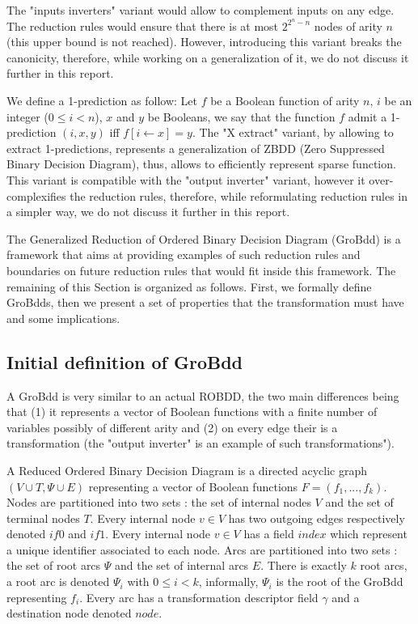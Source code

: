 \documentclass[a4paper,10pt]{article}
\begin{document}
The "inputs inverters" variant would allow to complement inputs on any edge.
The reduction rules would ensure that there is at most $2^{2^n-n}$ nodes of arity $n$ (this upper bound is not reached).
However, introducing this variant breaks the canonicity, therefore, while working on a generalization of it, we do not discuss it further in this report.

We define a 1-prediction as follow:
Let $f$ be a Boolean function of arity $n$, $i$ be an integer ($0\leq i < n$), $x$ and $y$ be Booleans, we say that the function $f$ admit a 1-prediction $(i, x, y)$ iff $f[i\leftarrow x] = y$.
The "X extract" variant, by allowing to extract 1-predictions, represents a generalization of ZBDD (Zero Suppressed Binary Decision Diagram), thus, allows to efficiently represent sparse function.
This variant is compatible with the "output inverter" variant, however it over-complexifies the reduction rules, therefore, while reformulating reduction rules in a simpler way, we do not discuss it further in this report.


The Generalized Reduction of Ordered Binary Decision Diagram (GroBdd) is a framework that aims at providing examples of such reduction rules and boundaries on future reduction rules that would fit inside this framework.
The remaining of this Section is organized as follows. First, we formally define GroBdds, then we present a set of properties that the transformation must have and some implications.

\subsection{Initial definition of GroBdd}

A GroBdd is very similar to an actual ROBDD, the two main differences being that (1) it represents a vector of Boolean functions with a finite number of variables possibly of different arity and (2) on every edge their is a transformation (the "output inverter" is an example of such transformations").

A Reduced Ordered Binary Decision Diagram is a directed acyclic graph $(V\cup T, \Psi \cup E)$ representing a vector of Boolean functions $F=(f_1, ..., f_k)$.
Nodes are partitioned into two sets : the set of internal nodes $V$ and the set of terminal nodes $T$.
Every internal node $v\in V$ has two outgoing edges respectively denoted $if0$ and $if1$.
Every internal node $v\in V$ has a field $index$ which represent a unique identifier associated to each node.
Arcs are partitioned into two sets : the set of root arcs $\Psi$ and the set of internal arcs $E$.
There is exactly $k$ root arcs, a root arc is denoted $\Psi_i$ with $0\leq i < k$, informally, $\Psi_i$ is the root of the GroBdd representing $f_i$.
Every arc has a transformation descriptor field $\gamma$ and a destination node denoted $node$.
\end{document}
